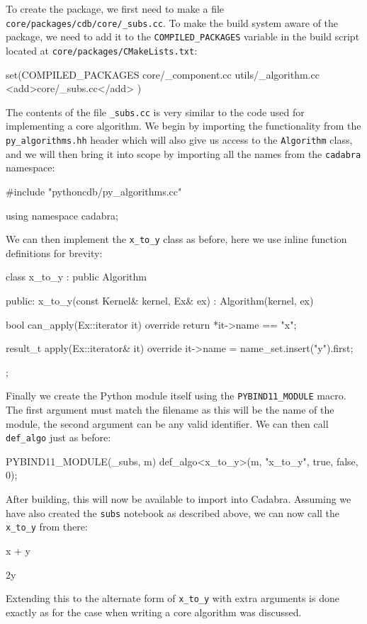 \documentclass{article}
\begin{document}
To create the package, we first need to make a file \verb|core/packages/cdb/core/_subs.cc|. To make the build system aware
of the package, we need to add it to the \verb|COMPILED_PACKAGES| variable in the build script located at
\verb|core/packages/CMakeLists.txt|:
\begin{lstverb}
set(COMPILED_PACKAGES
  core/_component.cc
  utils/_algorithm.cc
  <add>core/_subs.cc</add>
  )
\end{lstverb}
The contents of the file \verb|_subs.cc| is very similar to the code used for implementing a core algorithm. We begin by
importing the functionality from the \verb|py_algorithms.hh| header which will also give us access to the \verb|Algorithm|
class, and we will then bring it into scope by importing all the names from the \verb|cadabra| namespace:
\begin{lstcpp}
	#include "pythoncdb/py_algorithms.cc"
	
	using namespace cadabra;
\end{lstcpp}
We can then implement the \verb|x_to_y| class as before, here we use inline function definitions for brevity:
\begin{lstcpp}
	class x_to_y : public Algorithm {
		public:
			x_to_y(const Kernel& kernel, Ex& ex)
				: Algorithm(kernel, ex)
				{
	
				}
	
			bool can_apply(Ex::iterator it) override
				{
				return *it->name == "x";
				}
	
			result_t apply(Ex::iterator& it) override
				{
				it->name = name_set.insert("y").first;
				}
		};
\end{lstcpp}
Finally we create the Python module itself using the \verb|PYBIND11_MODULE| macro. The first argument must match the filename
as this will be the name of the module, the second argument can be any valid identifier. We can then call \verb|def_algo|
just as before:

\begin{lstcpp}
	PYBIND11_MODULE(_subs, m)
	{
		def_algo<x_to_y>(m, "x_to_y", true, false, 0);
	}
\end{lstcpp}
After building, this will now be available to import into Cadabra. Assuming we have also created the \verb|subs| notebook as
described above, we can now call the \verb|x_to_y| from there:
\begin{lstcdb}
	x + y
\end{lstcdb}
\begin{lstverb}
	2y
\end{lstverb}
Extending this to the alternate form of \verb|x_to_y| with extra arguments is done exactly as for the case when writing a 
core algorithm was discussed.
\end{document}
